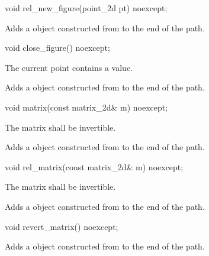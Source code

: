%
\begin{itemdecl}
void rel_new_figure(point_2d pt) noexcept;
\end{itemdecl}
\begin{itemdescr}
\pnum
\effects
Adds a  object constructed from  to the end of the path.
\end{itemdescr}

%
\begin{itemdecl}
void close_figure() noexcept;
\end{itemdecl}
\begin{itemdescr}
\pnum
\requires
The current point contains a value.

\pnum
\effects
Adds a  object constructed from  to the end of the path.
\end{itemdescr}

%
\begin{itemdecl}
void matrix(const matrix_2d& m) noexcept;
\end{itemdecl}
\begin{itemdescr}
\pnum
\requires
The matrix  shall be invertible.

\pnum
\effects
Adds a  object constructed from  to the end of the path.
\end{itemdescr}

%
\begin{itemdecl}
void rel_matrix(const matrix_2d& m) noexcept;
\end{itemdecl}
\begin{itemdescr}
\pnum
\requires
The matrix  shall be invertible.

\pnum
\effects
Adds a  object constructed from  to the end of the path.
\end{itemdescr}

%
\begin{itemdecl}
void revert_matrix() noexcept;
\end{itemdecl}
\begin{itemdescr}
\pnum
\effects
Adds a  object constructed from  to the end of the path.
\end{itemdescr}

